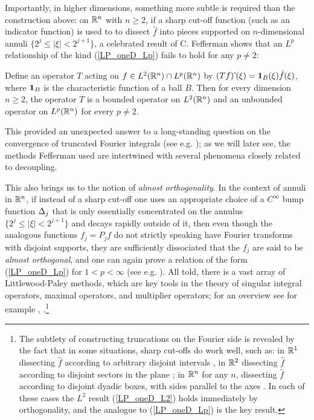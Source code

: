 \documentclass[brochure,english,12pt]{bourbaki}%
\begin{document}
Importantly, in higher dimensions, something more subtle is required than the construction above: on $\mathbb{R}^n$ with $n \geq 2$, if a  sharp cut-off function (such as an indicator function) is used to to dissect $\hat{f}$ into pieces supported on $n$-dimensional annuli $\{ 2^j \leq |\xi| < 2^{j+1} \}$, a celebrated result of C. Fefferman \cite{Fef71} shows that an $L^p$ relationship of the kind (\ref{LP_oneD_Lp}) fails to hold for any $p \neq 2$:
 \begin{theo}\label{thm_ball_multiplier}
 Define an operator $T$ acting on $f \in L^2(\mathbb{R}^n) \cap L^p(\mathbb{R}^n)$ by $(Tf)\hat{\:}(\xi) = \boldsymbol1_{B}(\xi) \hat{f}(\xi)$, where $\boldsymbol1_B$ is the characteristic function of a ball $B$. Then for every  dimension $n \geq 2$, the operator $T$ is a bounded operator on $L^2(\mathbb{R}^n)$ and an unbounded operator on $L^p(\mathbb{R}^n)$ for every $ p \neq 2$.
 \end{theo}
This provided an unexpected answer to a long-standing question on the convergence of truncated Fourier integrals (see e.g. \cite[p. 298]{Tao01}); as we will  later see, the methods Fefferman used are intertwined with several phenomena closely related to decoupling.
 
This also brings  us to the notion of \emph{almost orthogonality}. 
In the context of annuli in $\mathbb{R}^n$, if instead of a sharp cut-off one uses an appropriate choice of a $C^\infty$ bump function $\Delta_j$ that is only essentially concentrated on the annulus $\{ 2^j \leq |\xi| < 2^{j+1} \}$ and decays rapidly outside of it,  then even though  the analogous functions $f_j=P_j f$ do not strictly speaking have Fourier transforms with disjoint supports, they are sufficiently dissociated that the $f_j$ are said to be \emph{almost orthogonal}, and one can again prove a relation of the form (\ref{LP_oneD_Lp}) for $1<p<\infty$ (see e.g. \cite[Ch. 6]{Gra14a}). All told, there is a vast array of Littlewood-Paley methods, which are key tools in the theory of singular integral operators, maximal operators, and multiplier operators; for an overview see for example \cite[Ch. IV]{SingInt}, \cite[Ch. 8]{Duo01}.\footnote{The subtlety of constructing truncations on the Fourier side is revealed by the fact that in some situations, sharp cut-offs do work well, such as: in $\mathbb{R}^1$ dissecting $\hat{f}$ according to arbitrary disjoint intervals \cite{RdF85},  in $\mathbb{R}^2$ dissecting $\hat{f}$ according to disjoint sectors in the plane \cite{NSW78}; in $\mathbb{R}^n$ for any $n$, dissecting $\hat{f}$ according to disjoint dyadic boxes, with sides parallel to the axes \cite[Ch IV\S5]{SingInt}. In each of these cases the $L^2$ result (\ref{LP_oneD_L2}) holds immediately by orthogonality, and the analogue to (\ref{LP_oneD_Lp}) is the key result.}
\end{document}
